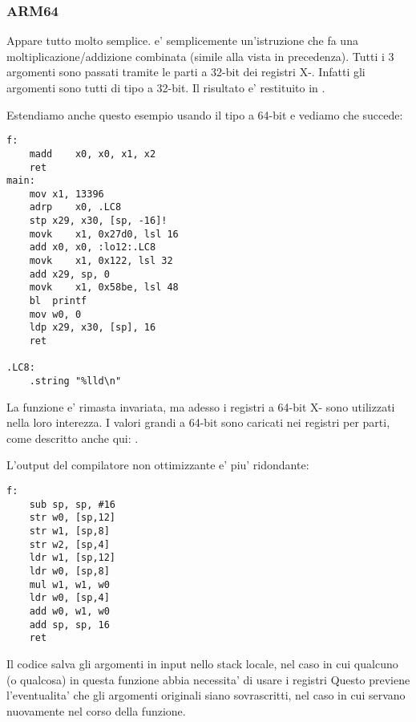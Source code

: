 \subsubsection{ARM64}


Appare tutto molto semplice.
 e' semplicemente un'istruzione che fa una moltiplicazione/addizione combinata (simile alla  vista in precedenza).
Tutti i 3 argomenti sono passati tramite le parti a 32-bit dei registri X-.
Infatti gli argomenti sono tutti di tipo  a 32-bit.
Il risultato e' restituito in .



Estendiamo anche questo esempio usando il tipo  a 64-bit e vediamo che succede:



\begin{lstlisting}
f:
	madd	x0, x0, x1, x2
	ret
main:
	mov	x1, 13396
	adrp	x0, .LC8
	stp	x29, x30, [sp, -16]!
	movk	x1, 0x27d0, lsl 16
	add	x0, x0, :lo12:.LC8
	movk	x1, 0x122, lsl 32
	add	x29, sp, 0
	movk	x1, 0x58be, lsl 48
	bl	printf
	mov	w0, 0
	ldp	x29, x30, [sp], 16
	ret

.LC8:
	.string	"%lld\n"
\end{lstlisting}

La funzione \ttf{} e' rimasta invariata, ma adesso i registri a 64-bit X- sono utilizzati nella loro interezza.
I valori grandi a 64-bit sono caricati nei registri per parti, come descritto anche qui: .


L'output del compilatore non ottimizzante e' piu' ridondante:

\begin{lstlisting}
f:
	sub	sp, sp, #16
	str	w0, [sp,12]
	str	w1, [sp,8]
	str	w2, [sp,4]
	ldr	w1, [sp,12]
	ldr	w0, [sp,8]
	mul	w1, w1, w0
	ldr	w0, [sp,4]
	add	w0, w1, w0
	add	sp, sp, 16
	ret
\end{lstlisting}

Il codice salva gli argomenti in input nello stack locale, nel caso in cui qualcuno (o qualcosa) in questa funzione abbia necessita' 
di usare i registri  
Questo previene l'eventualita' che gli argomenti originali siano sovrascritti, nel caso in cui servano nuovamente nel corso della funzione.

